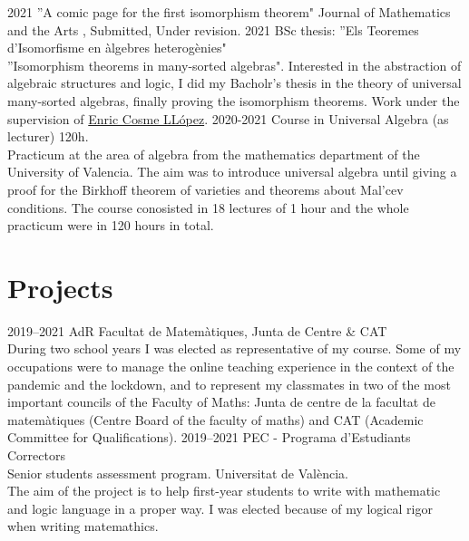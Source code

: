 \documentclass[]{cv-style}          %
\begin{document}
\begin{entrylist}
\entry
    {2021}
    {''A comic page for the first isomorphism theorem"}
    {Journal of Mathematics and the Arts}
    {, Submitted, Under revision.}
\entry
    {2021}
    {BSc thesis: ''Els Teoremes d'Isomorfisme en àlgebres heterogènies"}
    {}
    {\\''Isomorphism theorems in many-sorted algebras". Interested in the abstraction of algebraic structures and logic, I did my Bacholr's thesis in the theory of universal many-sorted algebras, finally proving the isomorphism theorems. Work under the supervision of \hyperlink{https://www.uv.es/coslloen/}{Enric Cosme LLópez}.}
\entry
    {2020-2021}
    {Course in Universal Algebra (as lecturer)}
    {120h.}
    {\\
    Practicum at the area of algebra from the mathematics department of the University of Valencia. The aim was to introduce universal algebra until giving a proof for the Birkhoff theorem of varieties and theorems about Mal'cev conditions. The course conosisted in 18 lectures of 1 hour and the whole practicum were in 120 hours in total.}
\end{entrylist}

\section{Projects}

\begin{entrylist}
\entry
    {2019--2021}
    {AdR Facultat de Matemàtiques, Junta de Centre \& CAT}
    {}
    {\\
    During two school years I was elected as representative of my course. Some of my occupations were to manage the online teaching experience in the context of the pandemic and the lockdown, and to represent my classmates in two of the most important councils of the Faculty of Maths: Junta de centre de la facultat de matemàtiques (Centre Board of the faculty of maths) and CAT (Academic Committee for Qualifications).}
\entry
    {2019--2021}
    {PEC - Programa d'Estudiants Correctors}
    {}
    { \\
    Senior students assessment program. Universitat de València.\\
    The aim of the project is to help first-year students to write with mathematic and logic language in a proper way. I was elected because of my logical rigor when writing matemathics.}
\end{entrylist}
\end{document}

